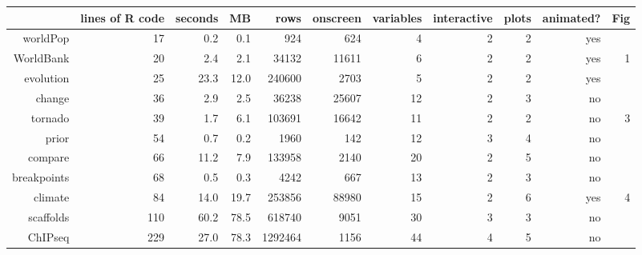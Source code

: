 \begin{tabular}{rrrrrrrrrrr}
  \hline
 & lines of R code & seconds & MB & rows & onscreen & variables & interactive & plots & animated? & Fig \\ 
  \hline
worldPop & 17 & 0.2 & 0.1 & 924 & 624 &  4 &  2 &  2 & yes &  \\ 
  WorldBank & 20 & 2.4 & 2.1 & 34132 & 11611 &  6 &  2 &  2 & yes &  1 \\ 
  evolution & 25 & 23.3 & 12.0 & 240600 & 2703 &  5 &  2 &  2 & yes &  \\ 
  change & 36 & 2.9 & 2.5 & 36238 & 25607 & 12 &  2 &  3 & no &  \\ 
  tornado & 39 & 1.7 & 6.1 & 103691 & 16642 & 11 &  2 &  2 & no &  3 \\ 
  prior & 54 & 0.7 & 0.2 & 1960 & 142 & 12 &  3 &  4 & no &  \\ 
  compare & 66 & 11.2 & 7.9 & 133958 & 2140 & 20 &  2 &  5 & no &  \\ 
  breakpoints & 68 & 0.5 & 0.3 & 4242 & 667 & 13 &  2 &  3 & no &  \\ 
  climate & 84 & 14.0 & 19.7 & 253856 & 88980 & 15 &  2 &  6 & yes &  4 \\ 
  scaffolds & 110 & 60.2 & 78.5 & 618740 & 9051 & 30 &  3 &  3 & no &  \\ 
  ChIPseq & 229 & 27.0 & 78.3 & 1292464 & 1156 & 44 &  4 &  5 & no &  \\ 
   \hline
\end{tabular}
